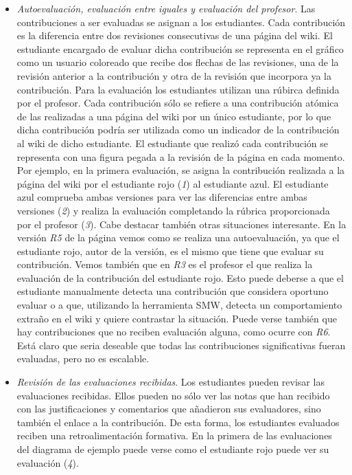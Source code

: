\begin{itemize}
\item \emph{Autoevaluación, evaluación entre iguales y evaluación del profesor}. Las contribuciones a ser evaluadas se asignan a los estudiantes.  Cada contribución es la diferencia entre dos revisiones consecutivas de una página del wiki. El estudiante encargado de evaluar dicha contribución se representa en el gráfico como un usuario coloreado que recibe dos flechas de las revisiones, una de la revisión anterior a la contribución y otra de la revisión que incorpora ya la contribución. Para la evaluación los estudiantes utilizan una rúbirca definida por el profesor. Cada contribución sólo se refiere a una contribución atómica de las realizadas a una página del wiki por un único estudiante, por lo que dicha contribución podría ser utilizada como un indicador de la contribución al wiki de dicho estudiante. El estudiante que realizó cada contribución se representa con una figura pegada a la revisión de la página en cada momento.
Por ejemplo, en la primera evaluación, se asigna la contribución realizada a la página del wiki por el estudiante rojo (\emph{1}) al estudiante azul. El estudiante azul comprueba ambas versiones para ver las diferencias entre ambas versiones (\emph{2}) y realiza la evaluación completando la rúbrica proporcionada por el profesor (\emph{3}).
Cabe destacar también otras situaciones interesante. En la versión \emph{R5} de la página vemos como se realiza una autoevaluación, ya que el estudiante rojo, autor de la versión, es el mismo que tiene que evaluar su contribución. Vemos también que en \emph{R3} es el profesor el que realiza la evaluación de la contribución del estudiante rojo. Esto puede deberse a que el estudiante manualmente detecta una contribución que considera oportuno evaluar o a que, utilizando la herramienta SMW, detecta un comportamiento extraño en el wiki y quiere contrastar la situación. 
Puede verse también que hay contribuciones que no reciben evaluación alguna, como ocurre con \emph{R6}. Está claro que seria deseable que todas las contribuciones significativas fueran evaluadas, pero no es escalable.
\item \emph{Revisión de las evaluaciones recibidas}. Los estudiantes pueden revisar las evaluaciones recibidas. Ellos pueden no sólo ver las notas que han recibido con las justificaciones y comentarios que añadieron sus evaluadores, sino también el enlace a la contribución. De esta forma, los estudiantes evaluados reciben una retroalimentación formativa. En la primera de las evaluaciones del diagrama de ejemplo puede verse como el estudiante rojo puede ver su evaluación (\emph{4}).

\end{itemize}
